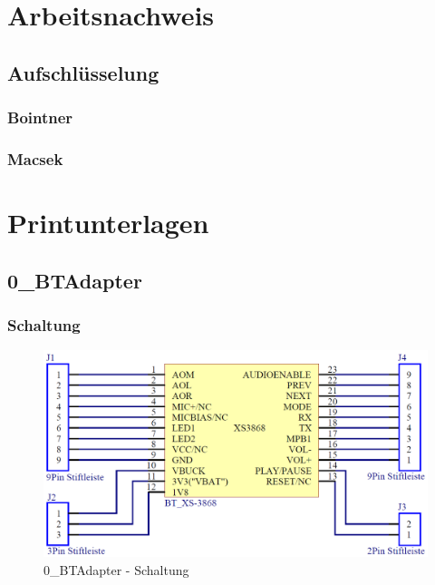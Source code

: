 \section{Arbeitsnachweis}\label{sec:8.9}
\subsection{Aufschlüsselung}
\subsubsection*{Bointner}

\subsubsection*{Macsek}

\newpage
\section{Printunterlagen}\label{sec:8.10}
\subsection{0\_BTAdapter}
\subsubsection*{Schaltung}
\begin{figure} [H]
	\centering
	\includegraphics[width=1\textwidth]{img/BTModul/adapter_sch.png}
	\caption{0\_BTAdapter - Schaltung}
	\label {fig:8.10.1}
\end{figure}

\newpage
